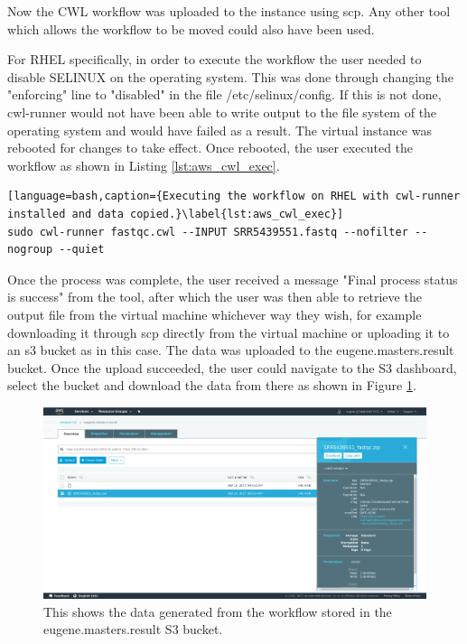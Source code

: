 Now the CWL workflow was uploaded to the instance using scp. Any other tool which allows the workflow to be moved could also have been used. 

For RHEL specifically, in order to execute the workflow the user needed to disable SELINUX on the operating system. This was done through changing the "enforcing" line to "disabled" in the file /etc/selinux/config. If this is not done, cwl-runner would not have been able to write output to the file system of the operating system and would have failed as a result. The virtual instance was rebooted for changes to take effect. Once rebooted, the user executed the workflow as shown in Listing \ref{lst:aws_cwl_exec}.

\begin{lstlisting}[language=bash,caption={Executing the workflow on RHEL with cwl-runner installed and data copied.}\label{lst:aws_cwl_exec}]
sudo cwl-runner fastqc.cwl --INPUT SRR5439551.fastq --nofilter --nogroup --quiet
\end{lstlisting}

Once the process was complete, the user received a message "Final process status is success" from the tool, after which the user was then able to retrieve the output file from the virtual machine whichever way they wish, for example downloading it through scp directly from the virtual machine or uploading it to an s3 bucket as in this case. The data was uploaded to the eugene.masters.result bucket. Once the upload succeeded, the user could navigate to the S3 dashboard, select the bucket and download the data from there as shown in Figure \ref{fig:aws_s3_result}.

\begin{figure}[h!]
\centering
\includegraphics[width=\textwidth]{Figures/4_s3_bucket_result.png}
\decoRule
\caption[AWS S3 Bucket with Result Data]{This shows the data generated from the workflow stored in the eugene.masters.result S3 bucket.}
\label{fig:aws_s3_result}
\end{figure}


